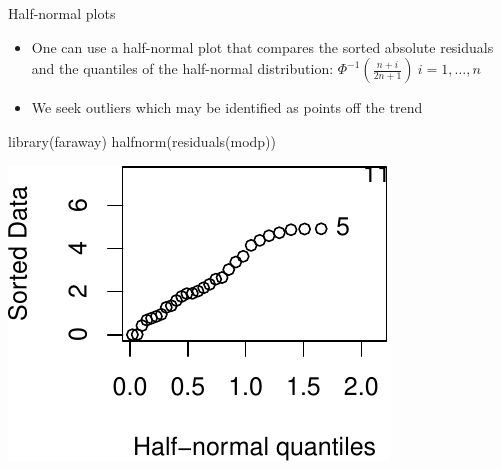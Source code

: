\documentclass[
  ignorenonframetext,
]{beamer}
\newenvironment{Shaded}{\begin{snugshade}}{\end{snugshade}}
\newcommand{\FunctionTok}[1]{\textcolor[rgb]{0.00,0.00,0.00}{#1}}
\newcommand{\NormalTok}[1]{#1}
\providecommand{\tightlist}{%
  \setlength{\itemsep}{0pt}\setlength{\parskip}{0pt}}
\begin{document}
\begin{frame}[fragile]{Half-normal plots}
\protect\hypertarget{half-normal-plots}{}
\begin{itemize}
\tightlist
\item
  One can use a half-normal plot that compares the sorted absolute
  residuals and the quantiles of the half-normal distribution:
  \(\Phi^{-1}\left(\frac{n+i}{2n+1}\right)~i=1,\ldots,n\)
\item
  We seek outliers which may be identified as points off the trend
\end{itemize}

\scriptsize

\begin{Shaded}
\begin{Highlighting}[]
\FunctionTok{library}\NormalTok{(faraway)}
\FunctionTok{halfnorm}\NormalTok{(}\FunctionTok{residuals}\NormalTok{(modp))}
\end{Highlighting}
\end{Shaded}

\includegraphics{week8_p1_files/figure-beamer/unnamed-chunk-5-1.pdf}
\end{frame}
\end{document}
